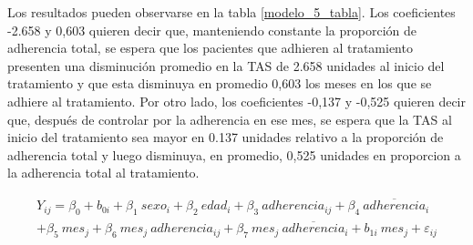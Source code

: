\documentclass[spanish]{article}
\numberwithin{figure}{subsection}
\numberwithin{equation}{subsection}
\numberwithin{table}{subsection}
\begin{document}
Los resultados pueden observarse en la tabla \ref{modelo_5_tabla}. Los
coeficientes -2.658 y 0,603 quieren decir que, manteniendo constante la
proporción de adherencia total, se espera que los pacientes que adhieren al
tratamiento presenten una disminución promedio en la TAS de 2.658 unidades al
inicio del tratamiento y que esta disminuya en promedio 0,603 los meses en los
que se adhiere al tratamiento. Por otro lado, los coeficientes -0,137 y -0,525
quieren decir que, después de controlar por la adherencia en ese mes, se espera
que la TAS al inicio del tratamiento sea mayor en 0.137 unidades relativo a la
proporción de adherencia total y luego disminuya, en promedio, 0,525 unidades en
proporcion a la adherencia total al tratamiento.


\begin{multline}
	\label{modelo_5}
	Y_{ij} = \beta_0 + b_{0i} + \beta_1\ sexo_i + \beta_2\ edad_i + \beta_{3}\ adherencia_{ij} + \beta_4\ \overline{adherencia}_i \\
	+ \beta_5\ mes_j + \beta_6\ mes_j\ adherencia_{ij} + \beta_7\ mes_j\ \overline{adherencia}_i + b_{1i}\ mes_j + \varepsilon_{ij}
\end{multline}
\end{document}
